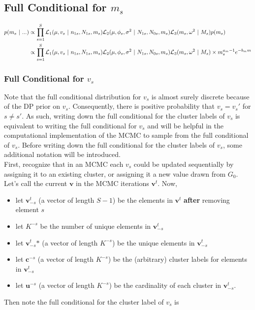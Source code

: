 \documentclass[12pt]{article}
\begin{document}
\subsection{Full Conditional for $m_s$}
\begin{align*}
p(m_s ~|~ ...) &\propto \prod_{s=1}^S \mathcal{L}_1(\mu,v_s~|~n_{1s},N_{1s},m_{s})\mathcal{L}_2(\mu,\phi_s,\sigma^2~|~N_{1s},N_{0s},m_{s})\mathcal{L}_3(m_s,\omega^2~|~M_{s}) p(m_s)\\
               &\propto \prod_{s=1}^S \mathcal{L}_1(\mu,v_s~|~n_{1s},N_{1s},m_{s})\mathcal{L}_2(\mu,\phi_s,\sigma^2~|~N_{1s},N_{0s},m_{s})\mathcal{L}_3(m_s,\omega^2~|~M_{s}) \times m_s^{a_m-1}e^{-b_m m} \\
\end{align*}


\subsubsection{Full Conditional for $v_s$}
Note that the full conditional distribution for $v_s$ is almost surely discrete because of the DP prior on $v_s$. 
Consequently, there is positive probability that $v_s=v_s'$ for $s\ne s'$. As such, writing down the full conditional for
the cluster labels of $v_s$ is equivalent to writing the full conditional for $v_s$ and will be helpful in the computational
implementation of the MCMC to sample from the full conditional of $v_s$. Before writing down the full conditional for the
cluster labels of $v_s$, some additional notation will be introduced.\\

\noindent
First, recognize that in an MCMC each $v_s$ could be updated sequentially by assigning it to an existing cluster,
or assigning it a new value drawn from $G_0$. Let's call the current $\bm v$ in the MCMC iterations $\bm v^t$. Now,

\def\vt{\bm v^t}
\def\vstar{ \vt_{-s}\mbox{*} }

\begin{itemize}
  \item let $\vt_{-s}$ (a vector of length $S-1$) be the elements in $\vt$ \textbf{after} removing element $s$
  \item let $K^{-s}$ be the number of unique elements in $\vt_{-s}$ 
  \item let $\vstar$ (a vector of length $K^{-s}$) be the unique elements in $\vt_{-s}$
  \item let $\bm c^{-s}$ (a vector of length $K^{-s}$) be the (arbitrary) cluster labels for elements in $\vt_{-s}$
  \item let $\bm u^{-s}$ (a vector of length $K^{-s}$) be the cardinality of each cluster in $\vt_{-s}$.
\end{itemize}
Then note the full conditional for the cluster label of $v_s$ is 
\end{document}
